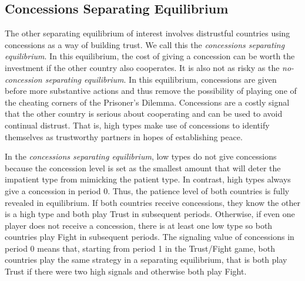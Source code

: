 \documentclass[12pt, letterpaper]{article}
\begin{document}

\subsection{Concessions Separating Equilibrium}
\label{sec:cse}
The other separating equilibrium of interest involves distrustful countries using concessions as a way of building trust. We call this the \emph{concessions separating equilibrium}. In this equilibrium, the cost of giving a concession can be worth the investment if the other country also cooperates. It is also not as risky as the \emph{no-concession separating equilibrium}. In this equilibrium, concessions are given before more substantive actions and thus remove the possibility of playing one of the cheating corners of the Prisoner's Dilemma. Concessions are a costly signal that the other country is serious about cooperating and can be used to avoid continual distrust. That is, high types make use of concessions to identify themselves as trustworthy partners in hopes of establishing peace.

In the \emph{concessions separating equilibrium}, low types do not give concessions because the concession level is set as the smallest amount that will deter the impatient type from mimicking the patient type. In contrast, high types always give a concession in period 0. Thus, the patience level of both countries is fully revealed in equilibrium. If both countries receive concessions, they know the other is a high type and both play Trust in subsequent periods. Otherwise, if even one player does not receive a concession, there is at least one low type so both countries play Fight in subsequent periods. The signaling value of concessions in period 0 means that, starting from period 1 in the Trust/Fight game, both countries play the same strategy in a separating equilibrium, that is both play Trust if there were two high signals and otherwise both play Fight.
\end{document}
